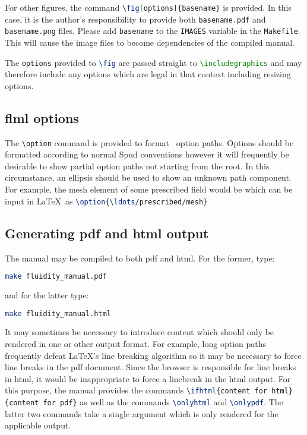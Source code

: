 For other figures, the command
\lstinline[language=TeX]+\fig[options]{basename}+ is provided. In this case,
it is the author's responsibility to provide both \verb+basename.pdf+ and
\verb+basename.png+ files. Please add \verb+basename+ to the \verb+IMAGES+
variable in the \verb+Makefile+. This will cause the image files to become
dependencies of the compiled manual.

The \lstinline[language=TeX]+options+ provided to
\lstinline[language=TeX]+\fig+ are passed straight to
\lstinline[language=TeX]+\includegraphics+ and may therefore include any
options which are legal in that context including resizing options.

\subsection{flml options}

The \verb+\option+ command is provided to format \fluidity\ option
paths. Options should be formatted according to normal Spud conventions
however it will frequently be desirable to show partial option paths not
starting from the root. In this circumstance, an ellipsis should be used to
show an unknown path component. For example, the mesh element of some
prescribed field would be  which can be input
in \LaTeX\ as \lstinline[language=TeX]+\option{\ldots/prescribed/mesh}+

\subsection{Generating pdf and html output}

The manual may be compiled to both pdf and html. For the former, type:
\begin{lstlisting}[language=bash]
  make fluidity_manual.pdf
\end{lstlisting}
and for the latter type:
\begin{lstlisting}[language=bash]
  make fluidity_manual.html
\end{lstlisting}
It may sometimes be necessary to introduce content which should only be
rendered in one or other output format. For example, long option paths
frequently defeat \LaTeX's line breaking algorithm so it may be necessary to
force line breaks in the pdf document. Since the browser is responsible for
line breaks in html, it would be inappropriate to force a linebreak in the
html output. For this purpose, the manual provides the commands
\lstinline[language=TeX]+\ifhtml{content for html}{content for pdf}+ as well
as the commands \lstinline[language=TeX]+\onlyhtml+ and
\lstinline[language=TeX]+\onlypdf+. The latter two commands take a single
argument which is only rendered for the applicable output.

